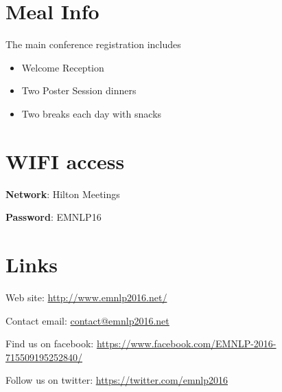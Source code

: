 \normalsize

\clearpage{}


\section*{Meal Info}

The main conference registration includes
\begin{itemize}
\item Welcome Reception
\item Two Poster Session dinners  
\item Two breaks each day with snacks
\end{itemize}

\section*{WIFI access}

\textbf{Network}: Hilton Meetings

\textbf{Password}: EMNLP16


\section*{Links}

Web site: \url{http://www.emnlp2016.net/}

Contact email: \url{contact@emnlp2016.net}

Find us on facebook: \url{https://www.facebook.com/EMNLP-2016-715509195252840/}

Follow us on twitter: \url{https://twitter.com/emnlp2016}



\clearpage{}\thispagestyle{empty}